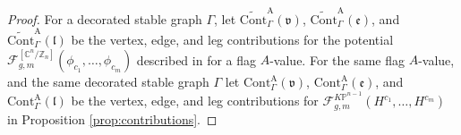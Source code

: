\documentclass[12pt]{amsart}
\numberwithin{equation}{section}
\newcommand{\CnZn}{[\mathbb{C}^n/\mathbb{Z}_n]}
\newcommand{\KP}{K\mathbb{P}}
\begin{document}
\begin{proof}
For a decorated stable graph $\Gamma$, let $\widetilde{\mathrm{Cont}}_{\Gamma}^{\mathrm{A}}(\mathfrak{v})$, $\widetilde{\mathrm{Cont}}_{\Gamma}^{\mathrm{A}}(\mathfrak{e})$, and $\widetilde{\mathrm{Cont}}_{\Gamma}^{\mathrm{A}}(\mathfrak{l})$ be the vertex, edge, and leg contributions for the potential $\mathcal{F}_{g, m}^{\CnZn}\left(\phi_{c_{1}}, \ldots, \phi_{c_{m}}\right)$ described in \cite[Proposition 3.3]{gt} for a flag $A$-value. For the same flag $A$-value, and the same decorated stable graph $\Gamma$ let $\mathrm{Cont}_{\Gamma}^{\mathrm{A}}(\mathfrak{v})$, $\mathrm{Cont}_{\Gamma}^{\mathrm{A}}(\mathfrak{e})$, and $\mathrm{Cont}_{\Gamma}^{\mathrm{A}}(\mathfrak{l})$ be the vertex, edge, and leg contributions for $\mathcal{F}_{g, m}^{\KP^{n-1}}\left(H^{c_{1}}, \ldots, H^{c_{m}}\right)$ in Proposition \ref{prop:contributions}.


\end{proof}
\end{document}
